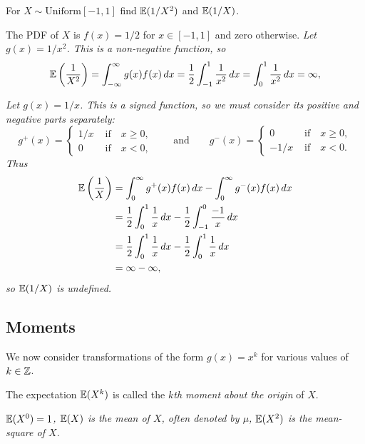 \begin{example}
For $X\sim\text{Uniform}[-1,1]$ find $\mathbb{E}(1/X^2)$ and $\mathbb{E}(1/X)$.
\begin{solution}
The PDF of $X$ is $f(x)=1/2$ for $x\in[-1,1]$ and zero otherwise.
\ben
\it Let $g(x) = 1/x^2$. This is a non-negative function, so
\begin{align*}
\mathbb{E}\left(\frac{1}{X^2}\right) 
	= \int_{-\infty}^{\infty} g(x)f(x)\,dx 
	= \frac{1}{2}\int_{-1}^{1} \frac{1}{x^2}\,dx
	= \int_{0}^{1}\frac{1}{x^2}\,dx
	= \infty,
\end{align*}

\it Let $g(x) = 1/x$. This is a signed function, so we must consider its positive and negative parts separately:
\[
g^{+}(x)	= \begin{cases}  1/x & \text{ if}\quad x\geq 0, \\ 0 & \text{ if}\quad x < 0,\end{cases}
\qquad\text{and}\qquad
g^{-}(x)	= \begin{cases}  0 & \text{ if}\quad x\geq 0, \\ -1/x & \text{ if}\quad x < 0.\end{cases}
\]
Thus
\begin{align*}
\mathbb{E}\left(\frac{1}{X}\right)
	& = \int_{0}^{\infty} g^{+}(x)f(x)\,dx - \int_{0}^{\infty} g^{-}(x) f(x)\,dx \\
	& = \frac{1}{2}\int_0^1 \frac{1}{x}\,dx - \frac{1}{2}\int_{-1}^0 \frac{-1}{x}\,dx \\
	& = \frac{1}{2}\int_0^1 \frac{1}{x}\,dx - \frac{1}{2}\int_{0}^{1} \frac{1}{x}\,dx \\
	& = \infty - \infty,
\end{align*}
so $\mathbb{E}(1/X)$ is undefined.
\een
\end{solution}
\end{example}

\subsection{Moments}

We now consider transformations of the form $g(x)=x^k$ for various values of $k\in\mathbb{Z}$.
\begin{definition}
The expectation $\mathbb{E}(X^{k})$ is called the \emph{$k$th moment about the origin} of $X$.
\end{definition}

\bit
\it $\mathbb{E}(X^0) = 1$,
\it $\mathbb{E}(X)$ is the \emph{mean} of $X$, often denoted by $\mu$,
\it $\mathbb{E}(X^2)$ is the \emph{mean-square} of $X$.
\eit

